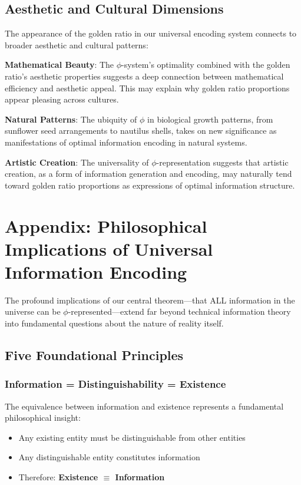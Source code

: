 \documentclass[12pt,letterpaper]{article}
\begin{document}
\subsection{Aesthetic and Cultural Dimensions}

The appearance of the golden ratio in our universal encoding system connects to broader aesthetic and cultural patterns:

\textbf{Mathematical Beauty}: The $\phi$-system's optimality combined with the golden ratio's aesthetic properties suggests a deep connection between mathematical efficiency and aesthetic appeal. This may explain why golden ratio proportions appear pleasing across cultures.

\textbf{Natural Patterns}: The ubiquity of $\phi$ in biological growth patterns, from sunflower seed arrangements to nautilus shells, takes on new significance as manifestations of optimal information encoding in natural systems.

\textbf{Artistic Creation}: The universality of $\phi$-representation suggests that artistic creation, as a form of information generation and encoding, may naturally tend toward golden ratio proportions as expressions of optimal information structure.

\section{Appendix: Philosophical Implications of Universal Information Encoding}

The profound implications of our central theorem—that ALL information in the universe can be $\phi$-represented—extend far beyond technical information theory into fundamental questions about the nature of reality itself.

\subsection{Five Foundational Principles}

\subsubsection{Information = Distinguishability = Existence}

The equivalence between information and existence represents a fundamental philosophical insight:

\begin{itemize}
\item Any existing entity must be distinguishable from other entities
\item Any distinguishable entity constitutes information
\item Therefore: \textbf{Existence $\equiv$ Information}
\end{itemize}
\end{document}
